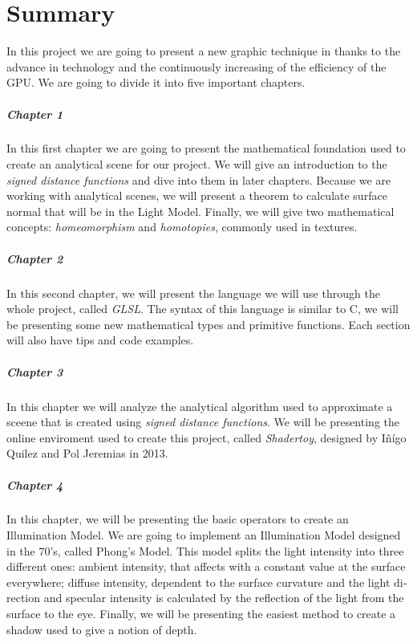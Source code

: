 \cleardoublepage

\chapter*{Summary}

\begin{otherlanguage}{english}
In this project we are going to present a new graphic technique in thanks to the advance in technology and the continuously increasing of the efficiency of the GPU. We are going to divide it into five important chapters.

\paragraph{Chapter 1} In this first chapter we are going to present the mathematical foundation used to create an analytical scene for our project. We will give an introduction to the \textit{signed distance functions} and dive into them in later chapters. Because we are working with analytical scenes, we will present a theorem to calculate surface normal that will be in the Light Model. Finally, we will give two mathematical concepts: \textit{homeomorphism} and \textit{homotopies}, commonly used in textures.

\paragraph{Chapter 2} In this second chapter, we will present the language we will use through the whole project, called \textit{GLSL}. The syntax of this language is similar to C, we will be presenting some new mathematical types and primitive functions. Each section will also have tips and code examples.

\paragraph{Chapter 3} In this chapter we will analyze the analytical algorithm used to approximate a sceene that is created using \textit{signed distance functions}. We will be presenting the online enviroment used to create this project, called \textit{Shadertoy}, designed by Iñígo Quilez and Pol Jeremias in 2013.

\paragraph{Chapter 4} In this chapter, we will be presenting the basic operators to create an Illumination Model. We are going to implement an Illumination Model designed in the 70's, called Phong's Model. This model splits the light intensity into three different ones: ambient intensity, that affects with a constant value at the surface everywhere; diffuse intensity, dependent to the surface curvature and the light direction and specular intensity is calculated by the reflection of the light from the surface to the eye. Finally, we will be presenting the easiest method to create a shadow used to give a notion of depth.


\end{otherlanguage}
